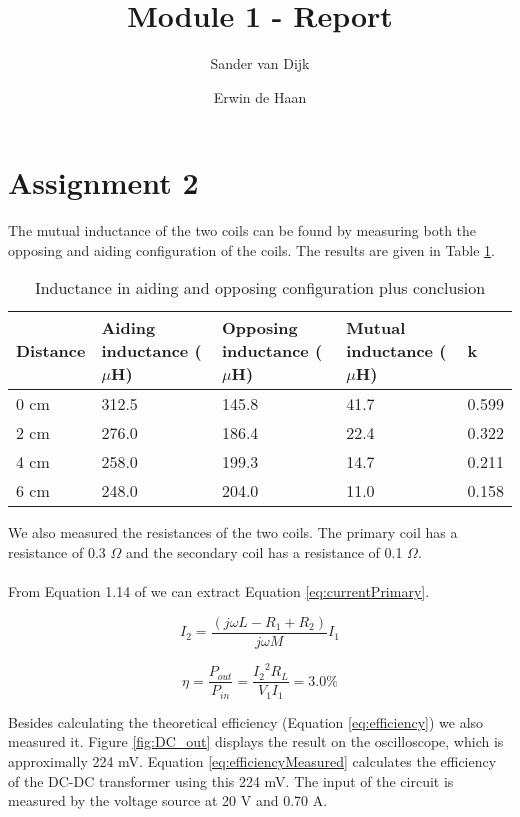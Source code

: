 \documentclass[final]{scrartcl} %
\title{Module 1 - Report}
\author{Sander {van Dijk} \and Erwin {de Haan}}
\begin{document}
\maketitle

\section{Assignment 2}
The mutual inductance of the two coils can be found by measuring both the opposing and aiding configuration of the coils. The results are given in Table \ref{tab:inductances}.

\begin{table} [h]
\begin{center}
	\begin{tabular}{ l | l | l | l | l }
	Distance & Aiding inductance ($\mu$H) & Opposing inductance ($\mu$H) & Mutual inductance ($\mu$H) & k \\ \hline
  	0 cm & 312.5 & 145.8 & 41.7 & 0.599 \\
	2 cm & 276.0 & 186.4 & 22.4 & 0.322 \\
	4 cm & 258.0 & 199.3 & 14.7 & 0.211 \\
	6 cm & 248.0 & 204.0 & 11.0 & 0.158 \\
	\end{tabular}
	\caption{Inductance in aiding and opposing configuration plus conclusion}
	\label{tab:inductances}
\end{center}
\end{table}

We also measured the resistances of the two coils. The primary coil has a resistance of 0.3 $\Omega$ and the secondary coil has a resistance of 0.1 $\Omega$.
\\ \\
From Equation 1.14 of \cite{epo4-manual} we can extract Equation \ref{eq:currentPrimary}.

\begin{equation}
	I_2 = \frac{(j \omega L - R_1 + R_2)}{j \omega M} I_1
	\label{eq:currentPrimary}
\end{equation}

\begin{equation}
	\eta = \frac{P_{out}}{P_{in}} = \frac{{I_2}^2 R_L}{V_1 I_1} = 3.0\%
	\label{eq:efficiency}
\end{equation}

Besides calculating the theoretical efficiency (Equation \ref{eq:efficiency}) we also measured it. Figure \ref{fig:DC_out} displays the result on the oscilloscope, which is approximally 224 mV. Equation \ref{eq:efficiencyMeasured} calculates the efficiency of the DC-DC transformer using this 224 mV. The input of the circuit is measured by the voltage source at 20 V and 0.70 A.
\end{document}
